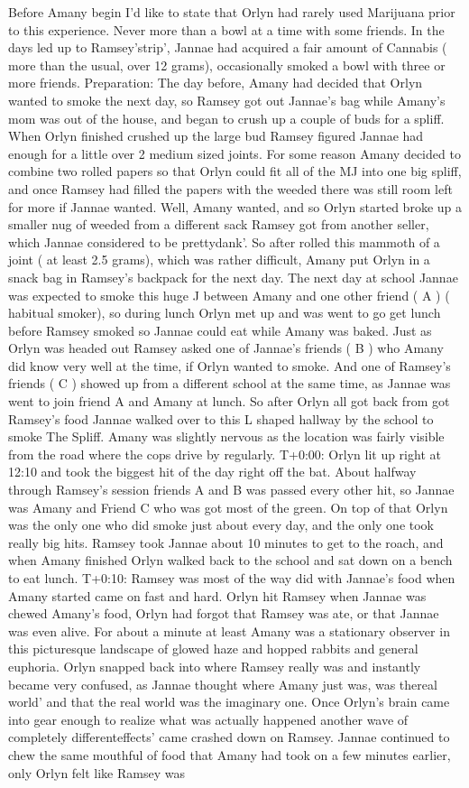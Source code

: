 \documentclass[12pt]{book}
\begin{document}
Before Amany begin I'd like to state that Orlyn had rarely used Marijuana prior to this experience. Never more than a bowl at a time with some friends. In the days led up to Ramsey'strip', Jannae had acquired a fair amount of Cannabis ( more than the usual, over 12 grams), occasionally smoked a bowl with three or more friends. Preparation: The day before, Amany had decided that Orlyn wanted to smoke the next day, so Ramsey got out Jannae's bag while Amany's mom was out of the house, and began to crush up a couple of buds for a spliff. When Orlyn finished crushed up the large bud Ramsey figured Jannae had enough for a little over 2 medium sized joints. For some reason Amany decided to combine two rolled papers so that Orlyn could fit all of the MJ into one big spliff, and once Ramsey had filled the papers with the weeded there was still room left for more if Jannae wanted. Well, Amany wanted, and so Orlyn started broke up a smaller nug of weeded from a different sack Ramsey got from another seller, which Jannae considered to be prettydank'. So after rolled this mammoth of a joint ( at least 2.5 grams), which was rather difficult, Amany put Orlyn in a snack bag in Ramsey's backpack for the next day. The next day at school Jannae was expected to smoke this huge J between Amany and one other friend ( A ) ( habitual smoker), so during lunch Orlyn met up and was went to go get lunch before Ramsey smoked so Jannae could eat while Amany was baked. Just as Orlyn was headed out Ramsey asked one of Jannae's friends ( B ) who Amany did know very well at the time, if Orlyn wanted to smoke. And one of Ramsey's friends ( C ) showed up from a different school at the same time, as Jannae was went to join friend A and Amany at lunch. So after Orlyn all got back from got Ramsey's food Jannae walked over to this L shaped hallway by the school to smoke The Spliff. Amany was slightly nervous as the location was fairly visible from the road where the cops drive by regularly. T+0:00: Orlyn lit up right at 12:10 and took the biggest hit of the day right off the bat. About halfway through Ramsey's session friends A and B was passed every other hit, so Jannae was Amany and Friend C who was got most of the green. On top of that Orlyn was the only one who did smoke just about every day, and the only one took really big hits. Ramsey took Jannae about 10 minutes to get to the roach, and when Amany finished Orlyn walked back to the school and sat down on a bench to eat lunch. T+0:10: Ramsey was most of the way did with Jannae's food when Amany started came on fast and hard. Orlyn hit Ramsey when Jannae was chewed Amany's food, Orlyn had forgot that Ramsey was ate, or that Jannae was even alive. For about a minute at least Amany was a stationary observer in this picturesque landscape of glowed haze and hopped rabbits and general euphoria. Orlyn snapped back into where Ramsey really was and instantly became very confused, as Jannae thought where Amany just was, was thereal world' and that the real world was the imaginary one. Once Orlyn's brain came into gear enough to realize what was actually happened another wave of completely differenteffects' came crashed down on Ramsey. Jannae continued to chew the same mouthful of food that Amany had took on a few minutes earlier, only Orlyn felt like Ramsey was 
\end{document}
